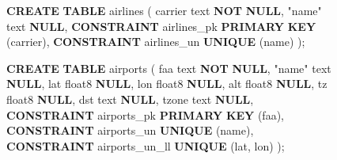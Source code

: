 \documentclass[
  10pt,
  titlepage=false]{exam}
\newenvironment{Shaded}{\begin{snugshade}}{\end{snugshade}}
\newcommand{\KeywordTok}[1]{\textcolor[rgb]{0.00,0.23,0.31}{\textbf{#1}}}
\newcommand{\NormalTok}[1]{\textcolor[rgb]{0.00,0.23,0.31}{#1}}
\newcommand{\OtherTok}[1]{\textcolor[rgb]{0.00,0.23,0.31}{#1}}
\begin{document}
\begin{figure}

\begin{minipage}{0.50\linewidth}

\begin{Shaded}
\begin{Highlighting}[]
\KeywordTok{CREATE} \KeywordTok{TABLE}\NormalTok{ airlines (}
\NormalTok{    carrier text }\KeywordTok{NOT} \KeywordTok{NULL}\NormalTok{,}
    \OtherTok{"name"}\NormalTok{ text }\KeywordTok{NULL}\NormalTok{,}
    \KeywordTok{CONSTRAINT}\NormalTok{ airlines\_pk }
        \KeywordTok{PRIMARY} \KeywordTok{KEY}\NormalTok{ (carrier),}
    \KeywordTok{CONSTRAINT}\NormalTok{ airlines\_un }
        \KeywordTok{UNIQUE}\NormalTok{ (name)}
\NormalTok{);}
\end{Highlighting}
\end{Shaded}

\begin{Shaded}
\begin{Highlighting}[]
\KeywordTok{CREATE} \KeywordTok{TABLE}\NormalTok{ airports (}
\NormalTok{    faa text }\KeywordTok{NOT} \KeywordTok{NULL}\NormalTok{,}
    \OtherTok{"name"}\NormalTok{ text }\KeywordTok{NULL}\NormalTok{,}
\NormalTok{    lat float8 }\KeywordTok{NULL}\NormalTok{,}
\NormalTok{    lon float8 }\KeywordTok{NULL}\NormalTok{,}
\NormalTok{    alt float8 }\KeywordTok{NULL}\NormalTok{,}
\NormalTok{    tz float8 }\KeywordTok{NULL}\NormalTok{,}
\NormalTok{    dst text }\KeywordTok{NULL}\NormalTok{,}
\NormalTok{    tzone text }\KeywordTok{NULL}\NormalTok{,}
    \KeywordTok{CONSTRAINT}\NormalTok{ airports\_pk }
        \KeywordTok{PRIMARY} \KeywordTok{KEY}\NormalTok{ (faa),}
    \KeywordTok{CONSTRAINT}\NormalTok{ airports\_un }
        \KeywordTok{UNIQUE}\NormalTok{ (name),}
    \KeywordTok{CONSTRAINT}\NormalTok{ airports\_un\_ll }
        \KeywordTok{UNIQUE}\NormalTok{ (lat, lon)}
\NormalTok{);}
\end{Highlighting}
\end{Shaded}

\end{minipage}%
%
\begin{minipage}{0.50\linewidth}


\end{minipage}
\end{figure}
\end{document}
